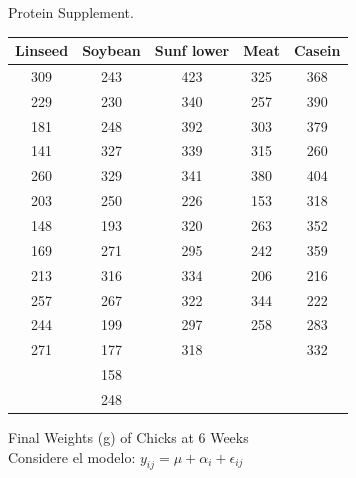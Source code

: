 \documentclass[12pt,a4paper]{report}
\begin{document}
Protein Supplement.

\begin{tabular}{| c | c | c | c | c |}
\hline
Linseed & Soybean & Sunf lower & Meat & Casein\\ \hline
309& 243& 423& 325& 368\\
229& 230& 340& 257& 390\\
181& 248& 392& 303& 379\\
141& 327& 339& 315& 260\\
260& 329& 341& 380& 404\\
203& 250& 226& 153& 318\\
148& 193& 320& 263& 352\\
169& 271& 295& 242& 359\\
213& 316& 334& 206& 216\\
257& 267& 322& 344& 222\\
244& 199& 297& 258& 283\\
271& 177& 318& &   332\\
&    158&      &  &\\
&     248 &   &    &\\
\hline
\end{tabular}

Final Weights (g) of Chicks at 6 Weeks\\

Considere el modelo: $y_{ij} = \mu + \alpha_i + \epsilon_{ij}$
\end{document}

